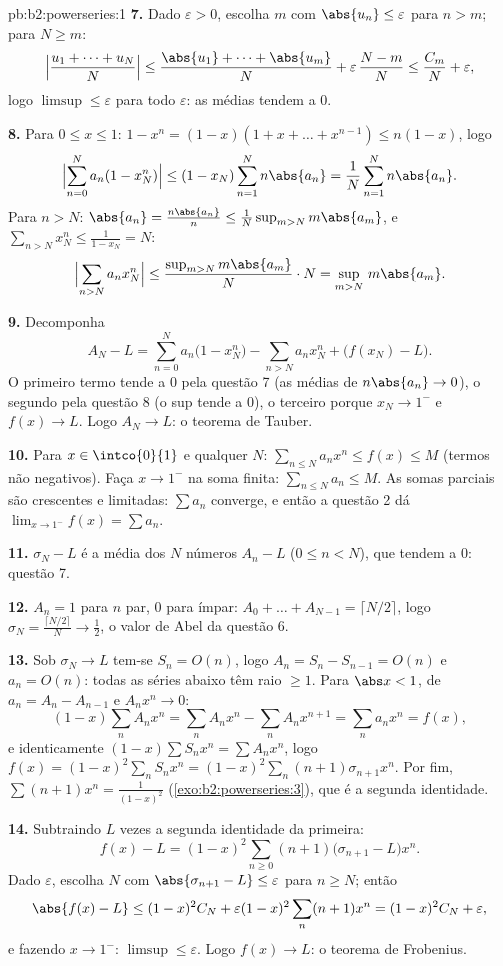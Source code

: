 \begin{solution}{pb:b2:powerseries:1}
\textbf{7.} Dado $\varepsilon > 0$, escolha $m$ com $\abs{u_n}
\leq \varepsilon$ para $n > m$; para $N \geq m$:
\[
\Bigl|\frac{u_1 + \dots + u_N}{N}\Bigr|
\leq \frac{\abs{u_1} + \dots + \abs{u_m}}{N} +
\varepsilon\,\frac{N - m}{N}
\leq \frac{C_m}{N} + \varepsilon,
\]
logo $\limsup \leq \varepsilon$ para todo $\varepsilon$: as
médias tendem a $0$.

\textbf{8.} Para $0 \leq x \leq 1$: $1 - x^n = (1-x)(1 + x +
\dots + x^{n-1}) \leq n(1-x)$, logo
\[
\Bigl|\sum_{n=0}^N a_n(1 - x_N^n)\Bigr|
\leq (1 - x_N)\sum_{n=1}^N n\abs{a_n}
= \frac1N\sum_{n=1}^{N}n\abs{a_n} .
\]
Para $n > N$: $\abs{a_n} = \frac{n\abs{a_n}}{n} \leq
\frac{1}{N}\sup_{m>N}m\abs{a_m}$, e $\sum_{n>N}x_N^n \leq
\frac{1}{1 - x_N} = N$:
\[
\Bigl|\sum_{n>N}a_nx_N^n\Bigr|
\leq \frac{\sup_{m>N}m\abs{a_m}}{N}\cdot N
= \sup_{m>N}\,m\abs{a_m} .
\]

\textbf{9.} Decomponha
\[
A_N - L = \sum_{n=0}^{N}a_n\bigl(1 - x_N^n\bigr)
- \sum_{n>N}a_nx_N^n + \bigl(f(x_N) - L\bigr) .
\]
O primeiro termo tende a $0$ pela questão 7 (as médias de
$n\abs{a_n} \to 0$), o segundo pela questão 8 (o sup tende a
$0$), o terceiro porque $x_N \to 1^-$ e $f(x) \to L$. Logo
$A_N \to L$: o teorema de Tauber.

\textbf{10.} Para $x \in \intco{0}{1}$ e qualquer $N$:
$\sum_{n\leq N}a_nx^n \leq f(x) \leq M$ (termos não negativos).
Faça $x \to 1^-$ na soma finita: $\sum_{n\leq N}a_n \leq M$.
As somas parciais são crescentes e limitadas: $\sum a_n$
converge, e então a questão 2 dá $\lim_{x\to1^-}f(x) =
\sum a_n$.

\textbf{11.} $\sigma_N - L$ é a média dos $N$ números
$A_n - L$ ($0 \leq n < N$), que tendem a $0$: questão 7.

\textbf{12.} $A_n = 1$ para $n$ par, $0$ para ímpar: $A_0 + \dots
+ A_{N-1} = \lceil N/2\rceil$, logo $\sigma_N =
\frac{\lceil N/2\rceil}{N} \to \frac12$, o valor de Abel da
questão 6.

\textbf{13.} Sob $\sigma_N \to L$ tem-se $S_n = O(n)$, logo
$A_n = S_n - S_{n-1} = O(n)$ e $a_n = O(n)$: todas as séries
abaixo têm raio $\geq 1$. Para $\abs x < 1$, de $a_n = A_n -
A_{n-1}$ e $A_nx^n \to 0$:
\[
(1-x)\sum_n A_nx^n = \sum_n A_nx^n - \sum_n A_nx^{n+1}
= \sum_n a_nx^n = f(x),
\]
e identicamente $(1-x)\sum S_nx^n = \sum A_nx^n$, logo $f(x) =
(1-x)^2\sum_n S_nx^n = (1-x)^2\sum_n(n+1)\sigma_{n+1}x^n$.
Por fim, $\sum(n+1)x^n = \frac{1}{(1-x)^2}$
(\cref{exo:b2:powerseries:3}), que é a segunda identidade.

\textbf{14.} Subtraindo $L$ vezes a segunda identidade da
primeira:
\[
f(x) - L = (1-x)^2\sum_{n\geq0}(n+1)
\bigl(\sigma_{n+1} - L\bigr)x^n .
\]
Dado $\varepsilon$, escolha $N$ com $\abs{\sigma_{n+1} - L}
\leq \varepsilon$ para $n \geq N$; então
\[
\abs{f(x) - L} \leq (1-x)^2 C_N +
\varepsilon(1-x)^2\sum_{n}(n+1)x^n
= (1-x)^2C_N + \varepsilon ,
\]
e fazendo $x \to 1^-$: $\limsup \leq \varepsilon$. Logo
$f(x) \to L$: o teorema de Frobenius.


\end{solution}
